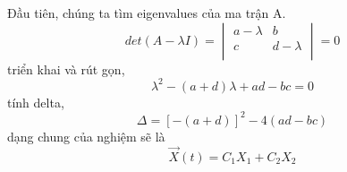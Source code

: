 \documentclass[a4paper]{article}
\begin{document}
    Đầu tiên, chúng ta tìm eigenvalues của ma trận A.
    \begin{equation*}
        det(A - \lambda I)
        =
        \begin{vmatrix}
            a-\lambda & b         \\
            c         & d-\lambda \\
        \end{vmatrix} = 0
    \end{equation*}
    triển khai và rút gọn,
    \begin{equation*}
        \lambda^2 - (a+d)\lambda + ad - bc = 0
    \end{equation*}
    tính delta,
    \begin{equation*}
        \Delta = [-(a+d)]^2 - 4(ad - bc)
    \end{equation*}
    dạng chung của nghiệm sẽ là
    \begin{equation}
        \vec{X}(t)
            = C_1 X_1 + C_2 X_2 \label{eq:equation}
    \end{equation}
\end{document}
